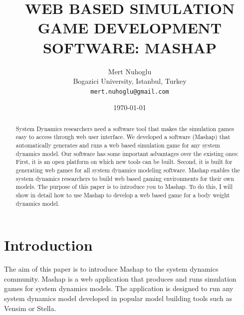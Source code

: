 \documentclass[12pt,a4paper]{paper}
\title{WEB BASED SIMULATION GAME DEVELOPMENT SOFTWARE: MASHAP}
\author{Mert Nuhoglu\\
	Bogazici University,
	Istanbul, Turkey\\
	\texttt{mert.nuhoglu@gmail.com}
}
\date{\today}
\begin{document}


\maketitle

\begin{abstract}
System Dynamics researchers need a software tool that makes the simulation games easy to access through web user interface. We developed a software (Mashap) that automatically generates and runs a web based simulation game for any system dynamics model. Our software has some important advantages over the existing ones: First, it is an open platform on which new tools can be built. Second, it is built for generating web games for all system dynamics modeling software. Mashap enables the system dynamics researchers to build web based gaming environments for their own models. The purpose of this paper is to introduce you to Mashap. To do this, I will show in detail how to use Mashap to develop a web based game for a body weight dynamics model. 
\end{abstract}

\section{Introduction}

The aim of this paper is to introduce Mashap to the system dynamics community. Mashap is a web application that produces and runs simulation games for system dynamics models. The application is designed to run any system dynamics model developed in popular model building tools such as Vensim or Stella. 
\end{document}
